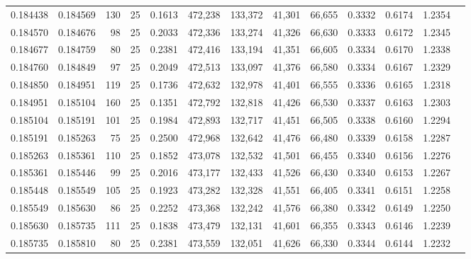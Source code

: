 \begin{tabular}{rrrrrrrrrrrrr}
0.184438 & 0.184569 &   130 &  25 &                                     0.1613 & 472,238 & 133,372 &  41,301 &  66,655 & 0.3332 & 0.6174 & 1.2354 \\
0.184570 & 0.184676 &    98 &  25 &                                     0.2033 & 472,336 & 133,274 &  41,326 &  66,630 & 0.3333 & 0.6172 & 1.2345 \\
0.184677 & 0.184759 &    80 &  25 &                                     0.2381 & 472,416 & 133,194 &  41,351 &  66,605 & 0.3334 & 0.6170 & 1.2338 \\
0.184760 & 0.184849 &    97 &  25 &                                     0.2049 & 472,513 & 133,097 &  41,376 &  66,580 & 0.3334 & 0.6167 & 1.2329 \\
0.184850 & 0.184951 &   119 &  25 &                                     0.1736 & 472,632 & 132,978 &  41,401 &  66,555 & 0.3336 & 0.6165 & 1.2318 \\
0.184951 & 0.185104 &   160 &  25 &                                     0.1351 & 472,792 & 132,818 &  41,426 &  66,530 & 0.3337 & 0.6163 & 1.2303 \\
0.185104 & 0.185191 &   101 &  25 &                                     0.1984 & 472,893 & 132,717 &  41,451 &  66,505 & 0.3338 & 0.6160 & 1.2294 \\
0.185191 & 0.185263 &    75 &  25 &                                     0.2500 & 472,968 & 132,642 &  41,476 &  66,480 & 0.3339 & 0.6158 & 1.2287 \\
0.185263 & 0.185361 &   110 &  25 &                                     0.1852 & 473,078 & 132,532 &  41,501 &  66,455 & 0.3340 & 0.6156 & 1.2276 \\
0.185361 & 0.185446 &    99 &  25 &                                     0.2016 & 473,177 & 132,433 &  41,526 &  66,430 & 0.3340 & 0.6153 & 1.2267 \\
0.185448 & 0.185549 &   105 &  25 &                                     0.1923 & 473,282 & 132,328 &  41,551 &  66,405 & 0.3341 & 0.6151 & 1.2258 \\
0.185549 & 0.185630 &    86 &  25 &                                     0.2252 & 473,368 & 132,242 &  41,576 &  66,380 & 0.3342 & 0.6149 & 1.2250 \\
0.185630 & 0.185735 &   111 &  25 &                                     0.1838 & 473,479 & 132,131 &  41,601 &  66,355 & 0.3343 & 0.6146 & 1.2239 \\
0.185735 & 0.185810 &    80 &  25 &                                     0.2381 & 473,559 & 132,051 &  41,626 &  66,330 & 0.3344 & 0.6144 & 1.2232 \\

\end{tabular}
